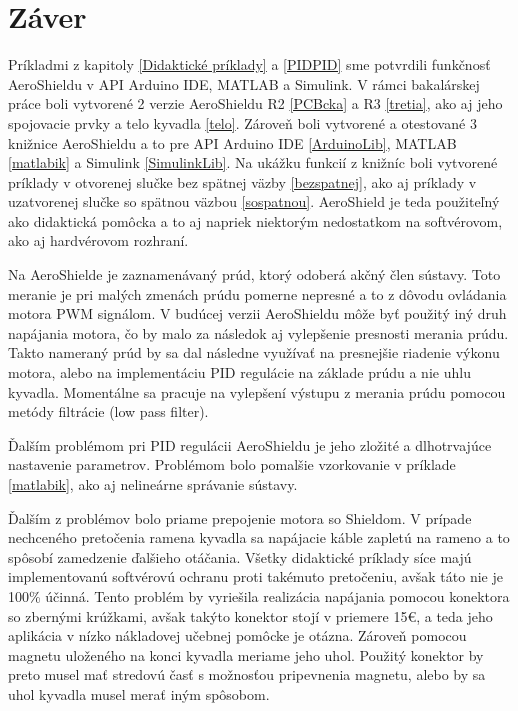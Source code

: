 \chapter{Záver}

Príkladmi z kapitoly \ref{Didaktické príklady} a \ref{PIDPID} sme potvrdili funkčnosť AeroShieldu v API Arduino IDE, MATLAB a Simulink. V rámci bakalárskej práce boli vytvorené 2 verzie AeroShieldu R2 \ref{PCBcka} a R3 \ref{tretia}, ako aj jeho spojovacie prvky a telo kyvadla \ref{telo}. Zároveň boli vytvorené a otestované 3 knižnice AeroShieldu a to pre API Arduino IDE \ref{ArduinoLib}, MATLAB \ref{matlabik} a Simulink \ref{SimulinkLib}. Na ukážku funkcií z knižníc boli vytvorené príklady v otvorenej slučke bez spätnej väzby \ref{bezspatnej}, ako aj príklady v uzatvorenej slučke so spätnou väzbou \ref{sospatnou}. AeroShield je teda použiteľný ako didaktická pomôcka a to aj napriek niektorým nedostatkom na softvérovom, ako aj hardvérovom rozhraní. 

Na AeroShielde je zaznamenávaný prúd, ktorý odoberá akčný člen sústavy. Toto meranie je pri malých zmenách prúdu pomerne nepresné a to z dôvodu ovládania motora PWM signálom. V budúcej verzii AeroShieldu môže byť použitý iný druh napájania motora, čo by malo za následok aj vylepšenie presnosti merania prúdu. Takto nameraný prúd by sa dal následne využívať na presnejšie riadenie výkonu motora, alebo na implementáciu PID regulácie na základe prúdu a nie uhlu kyvadla. Momentálne sa pracuje na vylepšení výstupu z merania prúdu pomocou metódy filtrácie (low pass filter).

Ďalším problémom pri PID regulácii AeroShieldu je jeho zložité a dlhotrvajúce nastavenie parametrov. Problémom bolo pomalšie vzorkovanie v príklade \ref{matlabik}, ako aj nelineárne správanie sústavy.

Ďalším z problémov bolo priame prepojenie motora so Shieldom. V prípade nechceného pretočenia ramena kyvadla sa napájacie káble zapletú na rameno a to spôsobí zamedzenie ďalšieho otáčania. Všetky didaktické príklady síce majú implementovanú softvérovú ochranu proti takémuto pretočeniu, avšak táto nie je 100\% účinná. 
Tento problém by vyriešila realizácia napájania pomocou konektora so zbernými krúžkami, avšak takýto konektor stojí v priemere 15\euro, a teda jeho aplikácia v nízko nákladovej učebnej pomôcke je otázna. Zároveň pomocou magnetu uloženého na konci kyvadla meriame jeho uhol. Použitý konektor by preto musel mať stredovú časť s možnosťou pripevnenia magnetu, alebo by sa uhol kyvadla musel merať iným spôsobom. 

